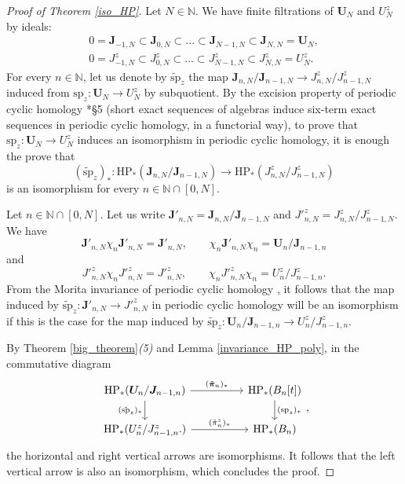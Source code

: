 \documentclass{amsart}
\theoremstyle{definition}
\begin{document}
\begin{proof}[Proof of Theorem \ref{iso_HP}]
    Let $N \in \mathbb{N}$. We have finite filtrations of $\bm{U}_N$ and $U^z_N$ by ideals:
    \begin{gather*}
        0 = \bm{J}_{-1,N} \subset \bm{J}_{0,N} \subset ... \subset \bm{J}_{N-1,N} \subset \bm{J}_{N,N} = \bm{U}_N,\\
        0 = J^z_{-1,N} \subset J^z_{0,N} \subset ... \subset J^z_{N-1,N} \subset J^z_{N,N} = U^z_N.
    \end{gather*}
    For every $n \in \mathbb{N}$, let us denote by $\tilde{\mathrm{sp}}_z$ the map $\bm{J}_{n,N}/\bm{J}_{n-1,N} \to J^z_{n,N}/J^z_{n-1,N}$ induced from $\mathrm{sp}_z : \bm{U}_N \to U_N^z$ by subquotient.
    By the excision property of periodic cyclic homology \cite{CuntzQuillenExcision}*{§5} (short exact sequences of algebras induce six-term exact sequences in periodic cyclic homology, in a functorial way), to prove that $\mathrm{sp}_z : \bm{U}_N \to U^z_N$ induces an isomorphism in periodic cyclic homology, it is enough the prove that
    \begin{equation}\label{map_HP}
        (\tilde{\mathrm{sp}}_z)_* : \mathrm{HP}_*(\bm{J}_{n,N}/\bm{J}_{n-1,N}) \to \mathrm{HP}_*(J^z_{n,N}/J^z_{n-1,N})
    \end{equation}
    is an isomorphism for every $n \in \mathbb{N} \cap [0,N]$.

    Let $n \in \mathbb{N} \cap [0,N]$. Let us write $\bm{J}'_{n,N} = \bm{J}_{n,N}/\bm{J}_{n-1,N}$ and $J'^z_{n,N} = J^z_{n,N}/J^z_{n-1,N}$. We have
    $$\bm{J}'_{n,N} \chi_{n} \bm{J}'_{n,N} = \bm{J}'_{n,N}, \qquad \chi_{n}\bm{J}'_{n,N}\chi_{n} = \bm{U}_n/\bm{J}_{n-1,n}$$
    and
    $$J'^z_{n,N}\chi_{n} J'^z_{n,N} = J'^z_{n,N},\qquad \chi_{n}J'^z_{n,N}\chi_{n}= U^z_{n}/J^z_{n-1,n}.$$
    From the Morita invariance of periodic cyclic homology \cite{CuntzMorita}, it follows that the map induced by $\tilde{\mathrm{sp}}_z : \bm{J}'_{n,N} \to J'^z_{n,N}$ in periodic cyclic homology will be an isomorphism if this is the case for the map induced by $\tilde{\mathrm{sp}}_z : \bm{U}_n/\bm{J}_{n-1,n} \to U^z_{n}/J^z_{n-1,n}$.

    By Theorem \ref{big_theorem}\textit{(5)} and Lemma \ref{invariance_HP_poly}, in the commutative diagram
    \[
    \begin{tikzcd}
        \mathrm{HP}_*(\bm{U}_n/\bm{J}_{n-1,n}) \ar[rr, "(\tilde{\bm{\pi}}_n)_*"] \ar[d, "(\tilde{\mathrm{sp}}_z)_*"'] && \mathrm{HP}_*(B_{n}[t]) \ar[d, "(\mathrm{sp}_z)_*"]\\
        \mathrm{HP}_*(U^z_{n}/J^z_{n-1,n}.) \ar[rr, "(\tilde{\pi}_n^z)_*"] & &\mathrm{HP}_*(B_{n})
    \end{tikzcd},
    \]
    the horizontal and right vertical arrows are isomorphisms. It follows that the left vertical arrow is also an isomorphism, which concludes the proof.
\end{proof}
\end{document}
